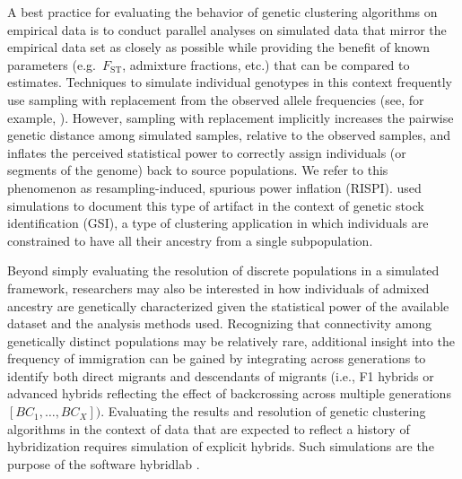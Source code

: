 A best practice for evaluating the behavior of genetic clustering algorithms on empirical data is to conduct
parallel analyses on simulated data that mirror the empirical data set
as closely as possible \citep{vaha2006efficiency,anderson2008improved,latch2011fine} while providing
the benefit of known parameters (e.g.~$F_\mathrm{ST}$, admixture fractions, etc.) that can
be compared to estimates.
Techniques to simulate individual genotypes in this context frequently use sampling with replacement from the
observed allele frequencies (see, for example, \citealt{nielsen2006hybridlab,kinziger2008hybridization}).
However, sampling with replacement implicitly increases the pairwise genetic distance among simulated samples, relative to the observed
samples, and
inflates the perceived statistical power to correctly assign individuals (or segments of the genome) back to source populations.
We refer to this phenomenon as resampling-induced, spurious power inflation (RISPI).
\citet{anderson2008improved} used simulations to document this type of artifact in the context of
genetic stock identification (GSI), a type of clustering application in which individuals are constrained to have
all their ancestry from a single subpopulation.


Beyond simply evaluating the resolution of discrete populations in a simulated framework, researchers may also be
interested in how individuals of admixed ancestry are genetically characterized given the statistical power of the available dataset and the
analysis methods used.
Recognizing that connectivity among genetically distinct populations may be relatively rare, additional insight into the
frequency of immigration can be gained by integrating across generations to identify both direct migrants and descendants of migrants
 (i.e., F1 hybrids or advanced hybrids reflecting the effect of backcrossing across multiple generations $[BC_1, \ldots,
BC_X])$.
Evaluating the results and resolution of genetic clustering algorithms in the context of data that are
expected to reflect a history of hybridization requires simulation of
explicit hybrids.  Such simulations are the purpose of the software {\sc hybridlab} 
\citep{nielsen2006hybridlab}.

